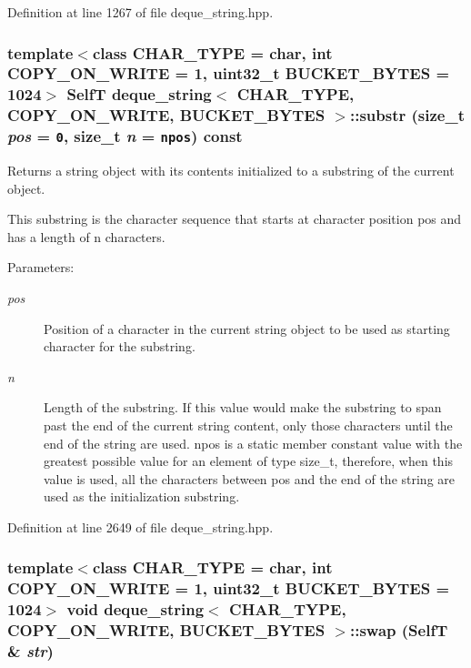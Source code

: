 Definition at line 1267 of file deque\_\-string.hpp.\hypertarget{classdeque__string_83a5b6ab306f888837fd3917acf59f0b}{
\subsubsection[{substr}]{\setlength{\rightskip}{0pt plus 5cm}template$<$class CHAR\_\-TYPE  = char, int COPY\_\-ON\_\-WRITE = 1, uint32\_\-t BUCKET\_\-BYTES = 1024$>$ {\bf SelfT} {\bf deque\_\-string}$<$ CHAR\_\-TYPE, COPY\_\-ON\_\-WRITE, BUCKET\_\-BYTES $>$::substr (size\_\-t {\em pos} = {\tt 0}, \/  size\_\-t {\em n} = {\tt {\bf npos}}) const}}
\label{classdeque__string_83a5b6ab306f888837fd3917acf59f0b}


Returns a string object with its contents initialized to a substring of the current object.

This substring is the character sequence that starts at character position pos and has a length of n characters.

\begin{Desc}
\item[Parameters:]
\begin{description}
\item[{\em pos}]Position of a character in the current string object to be used as starting character for the substring. \item[{\em n}]Length of the substring. If this value would make the substring to span past the end of the current string content, only those characters until the end of the string are used. npos is a static member constant value with the greatest possible value for an element of type size\_\-t, therefore, when this value is used, all the characters between pos and the end of the string are used as the initialization substring. \end{description}
\end{Desc}


Definition at line 2649 of file deque\_\-string.hpp.\hypertarget{classdeque__string_a1c4ef097e5967b11e1b06b13fb4a9bb}{
\subsubsection[{swap}]{\setlength{\rightskip}{0pt plus 5cm}template$<$class CHAR\_\-TYPE  = char, int COPY\_\-ON\_\-WRITE = 1, uint32\_\-t BUCKET\_\-BYTES = 1024$>$ void {\bf deque\_\-string}$<$ CHAR\_\-TYPE, COPY\_\-ON\_\-WRITE, BUCKET\_\-BYTES $>$::swap ({\bf SelfT} \& {\em str})}}
\label{classdeque__string_a1c4ef097e5967b11e1b06b13fb4a9bb}



